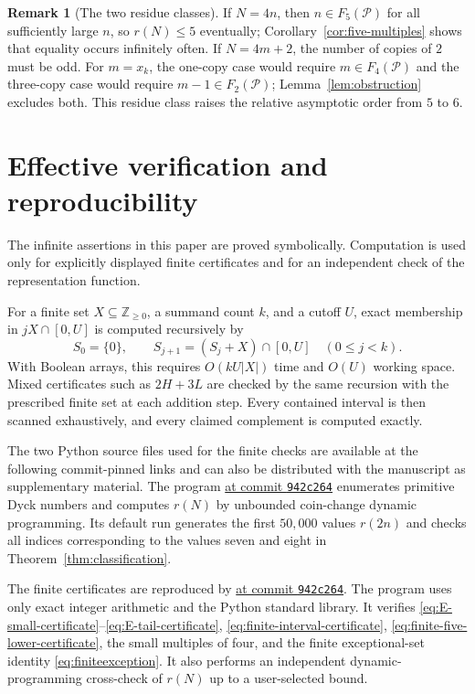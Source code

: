 \documentclass[11pt]{article}
\theoremstyle{plain}
\theoremstyle{definition}
\newtheorem{remark}[theorem]{Remark}
\newcommand{\Pset}{\mathcal P}
\begin{document}
\begin{remark}[The two residue classes]
If $N=4n$, then $n\in F_5(\Pset)$ for all sufficiently large $n$, so
$r(N)\leq5$ eventually; Corollary~\ref{cor:five-multiples} shows that
equality occurs infinitely often.  If $N=4m+2$, the number of copies of
$2$ must be odd.  For $m=x_k$, the one-copy case would require
$m\in F_4(\Pset)$ and the three-copy case would require
$m-1\in F_2(\Pset)$; Lemma~\ref{lem:obstruction} excludes both.  This
residue class raises the relative asymptotic order from $5$ to $6$.
\end{remark}

\section{Effective verification and reproducibility}\label{sec:verification}

The infinite assertions in this paper are proved symbolically.  Computation
is used only for explicitly displayed finite certificates and for an
independent check of the representation function.

For a finite set $X\subseteq\mathbb Z_{\geq0}$, a summand count $k$, and
a cutoff $U$, exact membership in $jX\cap[0,U]$ is computed recursively by
\[
 S_0=\{0\},\qquad
 S_{j+1}=(S_j+X)\cap[0,U]
 \quad(0\leq j<k).
\]
With Boolean arrays, this requires $O(kU|X|)$ time and $O(U)$ working
space.  Mixed certificates such as $2H+3L$ are checked by the same
recursion with the prescribed finite set at each addition step.  Every
contained interval is then scanned exhaustively, and every claimed
complement is computed exactly.

The two Python source files used for the finite checks are available at the
following commit-pinned links and can also be distributed with the
manuscript as supplementary material.  The program
\href{https://github.com/growupkuriyama-hub/lean_cfg_project/blob/942c264/LeanCfgProject/PrimDyck/primitive_dyck_representation.py}
{ at commit \texttt{942c264}}
enumerates primitive Dyck numbers and computes $r(N)$ by unbounded
coin-change dynamic programming.  Its default run generates the first
$50{,}000$ values $r(2n)$ and checks all indices corresponding to the
values seven and eight in Theorem~\ref{thm:classification}.

The finite certificates are reproduced by
\href{https://github.com/growupkuriyama-hub/lean_cfg_project/blob/942c264/LeanCfgProject/PrimDyck/verify_certificates_for_paper.py}
{ at commit \texttt{942c264}}.
The program uses only exact integer arithmetic and the Python standard
library.  It verifies
\eqref{eq:E-small-certificate}--\eqref{eq:E-tail-certificate},
\eqref{eq:finite-interval-certificate},
\eqref{eq:finite-five-lower-certificate}, the small multiples of four,
and the finite exceptional-set identity \eqref{eq:finiteexception}.  It
also performs an independent dynamic-programming cross-check of $r(N)$ up
to a user-selected bound.
\end{document}
